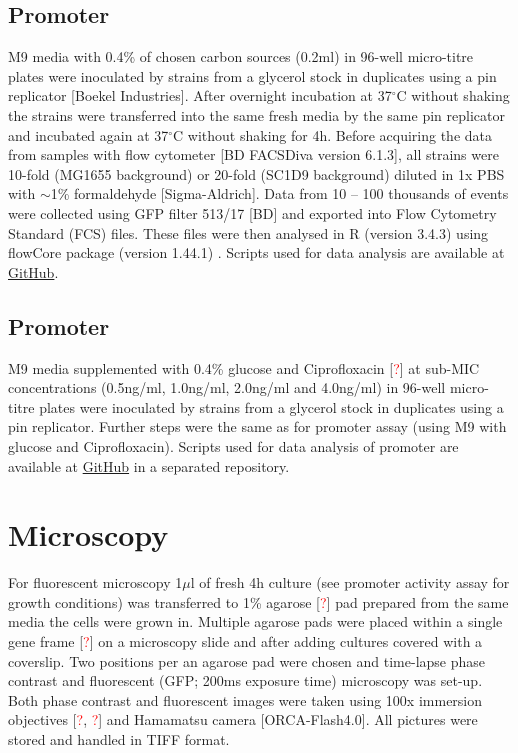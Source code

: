 \subsection{Promoter }
M9 media with 0.4\% of chosen carbon sources (0.2ml) in 96-well micro-titre plates were inoculated by strains from a glycerol stock in duplicates using a pin replicator [Boekel Industries].
After overnight incubation at 37$^{\circ}$C without shaking the strains were transferred into the same fresh media by the same pin replicator and incubated again at 37$^{\circ}$C without shaking for 4h.
Before acquiring the data from samples with flow cytometer [BD FACSDiva version 6.1.3], all strains were 10-fold (MG1655 background) or 20-fold (SC1\textunderscore D9 background) diluted in 1x PBS with $\sim$1\% formaldehyde [Sigma-Aldrich].
Data from 10 -- 100 thousands of events were collected using GFP filter 513/17 [BD] and exported into Flow Cytometry Standard (FCS) files.
These files were then analysed in R (version 3.4.3) using flowCore package (version 1.44.1) \cite{hahne2009flowcore}.
Scripts used for data analysis are available at \href{https://github.com/marketavlkova/LacZ_FC}{GitHub}.

\subsection{Promoter }
M9 media supplemented with 0.4\% glucose and Ciprofloxacin [\textcolor{red}{?}] at sub-MIC concentrations (0.5ng/ml, 1.0ng/ml, 2.0ng/ml and 4.0ng/ml) in 96-well micro-titre plates were inoculated by strains from a glycerol stock in duplicates using a pin replicator.
Further steps were the same as for  promoter assay (using M9 with glucose and Ciprofloxacin).
Scripts used for data analysis of  promoter are available at \href{https://github.com/marketavlkova/RecA}{GitHub} in a separated repository.

\section{Microscopy}
For fluorescent microscopy 1$\mu$l of fresh 4h culture (see promoter activity assay for growth conditions) was transferred to 1\% agarose [\textcolor{red}{?}] pad prepared from the same media the cells were grown in.
Multiple agarose pads were placed within a single gene frame [\textcolor{red}{?}] on a microscopy slide and after adding cultures covered with a coverslip.
Two positions per an agarose pad were chosen and time-lapse phase contrast and fluorescent (GFP; 200ms exposure time) microscopy was set-up.
Both phase contrast and fluorescent images were taken using 100x immersion objectives [\textcolor{red}{?}, \textcolor{red}{?}] and Hamamatsu camera [ORCA-Flash4.0].
All pictures were stored and handled in TIFF format.

\shorthandon{-} 
